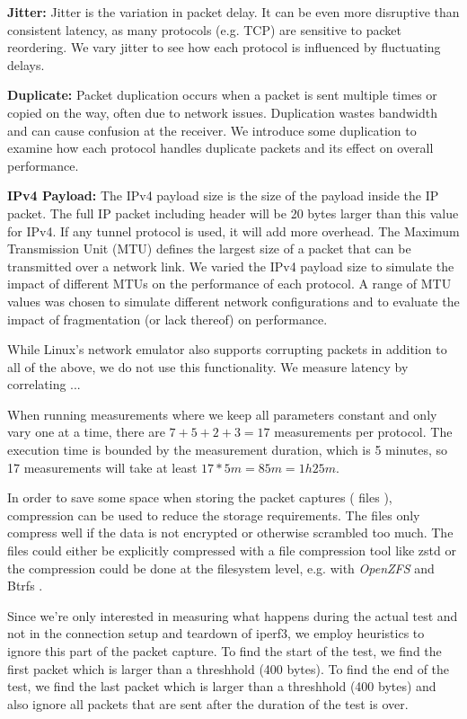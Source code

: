 \noindent\textbf{Jitter:} Jitter is the variation in packet delay.
It can be even more disruptive than consistent latency, as many protocols (e.g. TCP) are sensitive to packet reordering.
We vary jitter to see how each protocol is influenced by fluctuating delays.

\noindent\textbf{Duplicate:} Packet duplication occurs when a packet is sent multiple times or copied on the way, often due to network issues.
Duplication wastes bandwidth and can cause confusion at the receiver.
We introduce some duplication to examine how each protocol handles duplicate packets and its effect on overall performance.

\noindent\textbf{IPv4 Payload:} The IPv4 payload size is the size of the payload inside the IP packet.
The full IP packet including header will be 20 bytes larger than this value for IPv4.
If any tunnel protocol is used, it will add more overhead.
The Maximum Transmission Unit (MTU) defines the largest size of a packet that can be transmitted over a network link.
We varied the IPv4 payload size to simulate the impact of different MTUs on the performance of each protocol.
A range of MTU values was chosen to simulate different network configurations and to evaluate the impact of fragmentation (or lack thereof) on performance.

While Linux's network emulator also supports corrupting packets in addition to all of the above, we do not use this functionality.
We measure latency by correlating ... 


When running measurements where we keep all parameters constant and only vary one at a time, there are $7 + 5 + 2 + 3 = 17$ measurements per protocol.
The execution time is bounded by the measurement duration, which is 5 minutes, so 17 measurements will take at least $17 * 5 m = 85 m = 1h25m$.

In order to save some space when storing the packet captures ( files \cite{wiki:Pcap}), compression can be used to reduce the storage requirements.
The  files only compress well if the data is not encrypted or otherwise scrambled too much.
The files could either be explicitly compressed with a file compression tool like zstd or the compression could be done at the filesystem level, e.g. with \textit{OpenZFS} \cite{OpenZFS} and Btrfs \cite{Btrfs}.

Since we're only interested in measuring what happens during the actual test and not in the connection setup and teardown of iperf3, we employ heuristics to ignore this part of the packet capture.
To find the start of the test, we find the first packet which is larger than a threshhold (400 bytes).
To find the end of the test, we find the last packet which is larger than a threshhold (400 bytes) and also ignore all packets that are sent after the duration of the test is over.


